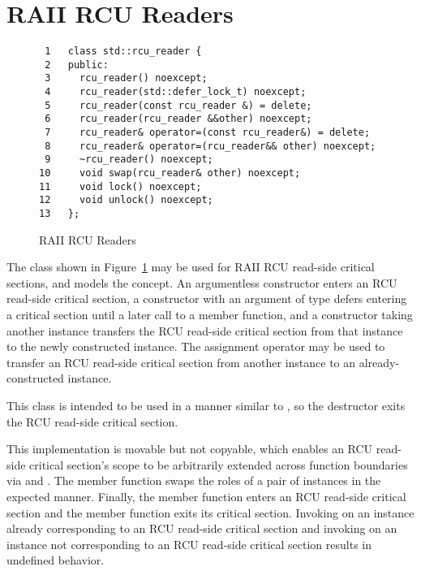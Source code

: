 \documentclass[letterpaper,10pt]{article}
\begin{document}
\section{RAII RCU Readers}
\label{sec:RAII RCU Readers}

\begin{figure}[tbp]
{ \scriptsize
\begin{verbatim}
 1   class std::rcu_reader {
 2   public:
 3     rcu_reader() noexcept;
 4     rcu_reader(std::defer_lock_t) noexcept;
 5     rcu_reader(const rcu_reader &) = delete;
 6     rcu_reader(rcu_reader &&other) noexcept;
 7     rcu_reader& operator=(const rcu_reader&) = delete;
 8     rcu_reader& operator=(rcu_reader&& other) noexcept;
 9     ~rcu_reader() noexcept;
10     void swap(rcu_reader& other) noexcept;
11     void lock() noexcept;
12     void unlock() noexcept;
13   };
\end{verbatim}
}
\caption{RAII RCU Readers}
\label{fig:RAII RCU Readers}
\end{figure}

The  class shown in
Figure~\ref{fig:RAII RCU Readers}
may be used for RAII RCU read-side critical sections, and
models the  concept.
An argumentless constructor enters an RCU read-side critical section,
a constructor with an argument of type  defers
entering a critical section until a later call to a
 member function,
and a constructor taking another  instance
transfers the RCU read-side critical section from that instance
to the newly constructed instance.
The assignment operator may be used to transfer an RCU read-side critical
section from another  instance to an already-constructed
instance.

This class is intended to be used in a manner similar to ,
so the destructor exits the RCU read-side critical section.

This implementation is movable but not copyable, which enables
an RCU read-side critical section's scope to be arbitrarily
extended across function boundaries via  and
.
The  member function swaps the roles
of a pair of  instances in the expected manner.
Finally, the  member function enters an
RCU read-side critical section and the 
member function exits its critical section.
Invoking  on an instance already corresponding
to an RCU read-side critical section and invoking
 on an instance not corresponding to
an RCU read-side critical section results in undefined behavior.
\end{document}
